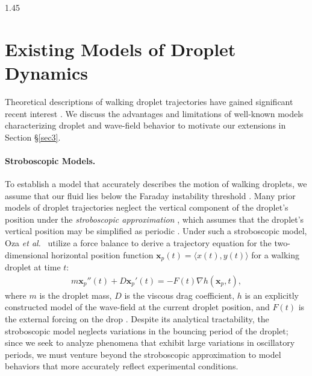 \documentclass[12pt,titlepage]{article}
\theoremstyle{definition}
\theoremstyle{remark}
\newcommand{\M}[1]{\mathbf{#1}}
\begin{document}
\begin{spacing}{1.45}
\section{Existing Models of Droplet Dynamics}
\label{sec2}

Theoretical descriptions of walking droplet trajectories have gained significant recent interest \cite{oza2013trajectory, kaydureybush, bush2015pilot, molavcek2013drops,molavcek2013dropsb}. We discuss the advantages and limitations of well-known models characterizing droplet and wave-field behavior to motivate our extensions in Section §\ref{sec3}.

\paragraph{Stroboscopic Models.}

To establish a model that accurately describes the motion of walking droplets, we assume that our fluid lies below the Faraday instability threshold \cite{faraday1831xvii, benjamin1954stability}. Many prior models of droplet trajectories neglect the vertical component of the droplet's position under the \textit{stroboscopic approximation} \cite{molavcek2013drops}, which assumes that the droplet's vertical position may be simplified as periodic \cite{protiere2006particle}. Under such a stroboscopic model, Oza \textit{et al.}\ \cite{oza2013trajectory} utilize a force balance to derive a trajectory equation for the two-dimensional horizontal position function $\M{x}_p(t) = \langle x(t), y(t) \rangle$ for a walking droplet at time $t$:
\begin{align}
\label{eq_oza}
m\M{x}_p''(t) + D\M{x}_p'(t) = -F(t) \nabla h(\M{x}_p, t),
\end{align}
where $m$ is the droplet mass, $D$ is the viscous drag coefficient, $h$ is an explicitly constructed model of the wave-field at the current droplet position, and $F(t)$ is the external forcing on the drop \cite{molavcek2013drops}. Despite its analytical tractability, the stroboscopic model neglects variations in the bouncing period of the droplet; since we seek to analyze phenomena that exhibit large variations in oscillatory periods, we must venture beyond the stroboscopic approximation to model behaviors that more accurately reflect experimental conditions.





\end{spacing}
\end{document}
